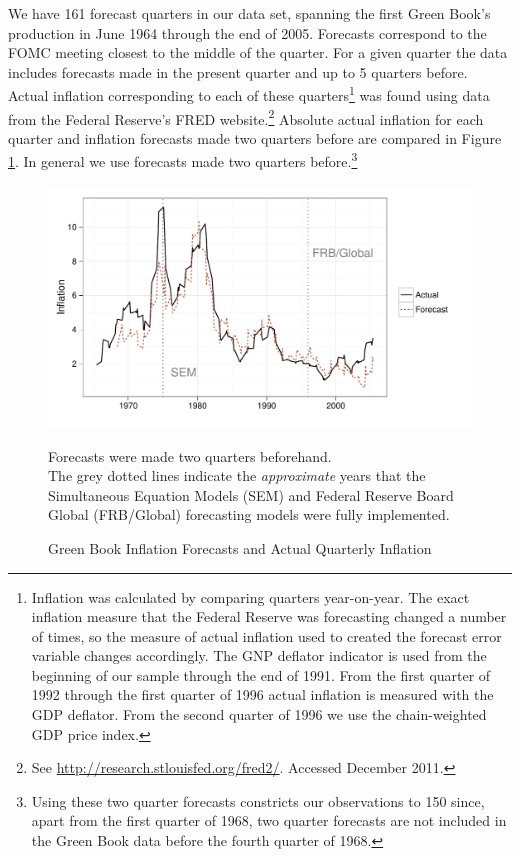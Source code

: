 \documentclass[a4paper]{article}\usepackage{graphicx, color}
\newenvironment{knitrout}{}{} %
\begin{document}
We have 161 forecast quarters in our data set, spanning the first Green Book's production in June 1964 through the end of 2005. Forecasts correspond to the FOMC meeting closest to the middle of the quarter. For a given quarter the data includes forecasts made in the present quarter and up to 5 quarters before. Actual inflation corresponding to each of these quarters\footnote{Inflation was calculated by comparing quarters year-on-year. The exact inflation measure that the Federal Reserve was forecasting changed a number of times, so the measure of actual inflation used to created the forecast error variable changes accordingly. The GNP deflator indicator is used from the beginning of our sample through the end of 1991. From the first quarter of 1992 through the first quarter of 1996 actual inflation is measured with the GDP deflator.  From the second quarter of 1996 we use the chain-weighted GDP price index. } was found using data from the Federal Reserve's FRED website.\footnote{See \url{http://research.stlouisfed.org/fred2/}. Accessed December 2011.} Absolute actual inflation for each quarter and inflation forecasts made two quarters before are compared in Figure \ref{absolute}. In general we use forecasts made two quarters before.\footnote{Using these two quarter forecasts constricts our observations to 150 since, apart from the first quarter of 1968, two quarter forecasts are not included in the Green Book data before the fourth quarter of 1968.} 


\begin{figure}[t]
    \caption{Green Book Inflation Forecasts and Actual Quarterly Inflation}
    \label{absolute}
    \begin{center}
    
\begin{knitrout}
\color{fgcolor}\includegraphics[width=0.8\linewidth]{figure/BaseInflation} 
\end{knitrout}

    
    \end{center}
    \begin{singlespace}
        {\scriptsize{Forecasts were made two quarters beforehand. \\
                     The grey dotted lines indicate the {\emph{approximate}} years that the Simultaneous Equation Models (SEM) and Federal Reserve Board Global (FRB/Global) forecasting models were fully implemented.  
                      }}
    \end{singlespace}
\end{figure}
\end{document}
